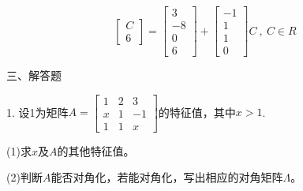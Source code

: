 \documentclass{article}
\begin{document}
\begin{jie}
\begin{equation*}
\begin{bmatrix}
   C\\
   6
 \end{bmatrix}
 =
  \begin{bmatrix}
   3 \\
   -8 \\
   0\\
   6
 \end{bmatrix}
 +
  \begin{bmatrix}
   -1 \\
   1 \\
   1\\
   0
 \end{bmatrix}C
 ~,~C\in R
\end{equation*}
\end{jie}

三、解答题

1. 设1为矩阵$A=
\begin{bmatrix}
  1 & 2 & 3 \\
  x & 1 & -1 \\
  1 & 1 & x
\end{bmatrix}
$的特征值，其中$x>1$.

(1)求$x$及$A$的其他特征值。

(2)判断$A$能否对角化，若能对角化，写出相应的对角矩阵$\Lambda$。
\end{document}
